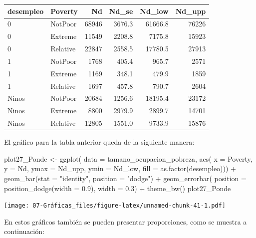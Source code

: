 \documentclass[
  12pt,
]{book}
\newenvironment{Shaded}{\begin{snugshade}}{\end{snugshade}}
\newcommand{\AttributeTok}[1]{\textcolor[rgb]{0.77,0.63,0.00}{#1}}
\newcommand{\FloatTok}[1]{\textcolor[rgb]{0.00,0.00,0.81}{#1}}
\newcommand{\FunctionTok}[1]{\textcolor[rgb]{0.00,0.00,0.00}{#1}}
\newcommand{\NormalTok}[1]{#1}
\newcommand{\OtherTok}[1]{\textcolor[rgb]{0.56,0.35,0.01}{#1}}
\newcommand{\SpecialCharTok}[1]{\textcolor[rgb]{0.00,0.00,0.00}{#1}}
\newcommand{\StringTok}[1]{\textcolor[rgb]{0.31,0.60,0.02}{#1}}
\begin{document}
\begin{tabular}{l|l|r|r|r|r}
\hline
desempleo & Poverty & Nd & Nd\_se & Nd\_low & Nd\_upp\\
\hline
0 & NotPoor & 68946 & 3676.3 & 61666.8 & 76226\\
\hline
0 & Extreme & 11549 & 2208.8 & 7175.8 & 15923\\
\hline
0 & Relative & 22847 & 2558.5 & 17780.5 & 27913\\
\hline
1 & NotPoor & 1768 & 405.4 & 965.7 & 2571\\
\hline
1 & Extreme & 1169 & 348.1 & 479.9 & 1859\\
\hline
1 & Relative & 1697 & 457.8 & 790.7 & 2604\\
\hline
Ninos & NotPoor & 20684 & 1256.6 & 18195.4 & 23172\\
\hline
Ninos & Extreme & 8800 & 2979.9 & 2899.7 & 14701\\
\hline
Ninos & Relative & 12805 & 1551.0 & 9733.9 & 15876\\
\hline
\end{tabular}

El gráfico para la tabla anterior queda de la siguiente manera:

\begin{Shaded}
\begin{Highlighting}[]
\NormalTok{plot27\_Ponde }\OtherTok{\textless{}{-}} \FunctionTok{ggplot}\NormalTok{(}
  \AttributeTok{data =}\NormalTok{ tamano\_ocupacion\_pobreza,}
    \FunctionTok{aes}\NormalTok{(}
      \AttributeTok{x =}\NormalTok{ Poverty,}
      \AttributeTok{y =}\NormalTok{ Nd,}
      \AttributeTok{ymax =}\NormalTok{ Nd\_upp,}
      \AttributeTok{ymin =}\NormalTok{ Nd\_low,}
      \AttributeTok{fill =} \FunctionTok{as.factor}\NormalTok{(desempleo))) }\SpecialCharTok{+}
  \FunctionTok{geom\_bar}\NormalTok{(}\AttributeTok{stat =} \StringTok{"identity"}\NormalTok{, }\AttributeTok{position =} \StringTok{"dodge"}\NormalTok{) }\SpecialCharTok{+}
  \FunctionTok{geom\_errorbar}\NormalTok{(}
    \AttributeTok{position =} \FunctionTok{position\_dodge}\NormalTok{(}\AttributeTok{width =} \FloatTok{0.9}\NormalTok{),}
    \AttributeTok{width =} \FloatTok{0.3}\NormalTok{) }\SpecialCharTok{+}
  \FunctionTok{theme\_bw}\NormalTok{()}
\NormalTok{plot27\_Ponde}
\end{Highlighting}
\end{Shaded}

\texttt{[image: 07-Gráficas\_files/figure-latex/unnamed-chunk-41-1.pdf]}

En estos gráficos también se pueden presentar proporciones, como se muestra a continuación:
\end{document}
